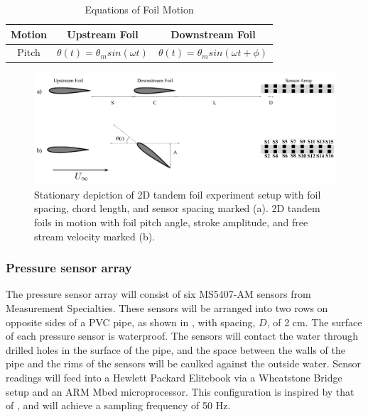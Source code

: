 \begin{table}
\caption{Equations of Foil Motion}
\label{tab:methods:EOM}
\begin{center}
\begin{tabular}{ccc}
\toprule
Motion & Upstream Foil & Downstream Foil \\ 
\midrule
Pitch & \(\theta(t)=\theta _msin(\omega t)\) & \(\theta (t)=\theta _msin(\omega t+\phi)\) \\
\end{tabular}
\end{center}
\end{table}
\begin{figure}
\begin{center}
\includegraphics[width=0.8\columnwidth]{figures/Experimental Setup.png}
\end{center}
\caption{Stationary depiction of 2D tandem foil experiment setup with foil spacing, chord length, and sensor spacing marked (a). 2D tandem foils in motion with foil pitch angle, stroke amplitude, and free stream velocity marked (b).}
\label{fig:methods:2D Setup}
\end{figure}

\subsubsection{Pressure sensor array}

    The pressure sensor array will consist of six MS5407-AM sensors from Measurement Specialties. These sensors will be arranged into two rows on opposite sides of a PVC pipe, as shown in , with spacing, \(D\), of 2 cm. The surface of each pressure sensor is waterproof. The sensors will contact the water through drilled holes in the surface of the pipe, and the space between the walls of the pipe and the rims of the sensors will be caulked against the outside water. Sensor readings will feed into a Hewlett Packard Elitebook via a Wheatstone Bridge setup and an ARM Mbed microprocessor. This configuration is inspired by that of \citep{Venturelli2012}, and will achieve a sampling frequency of 50 Hz.

